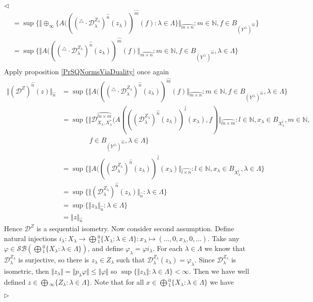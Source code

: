 \documentclass[12pt]{article}
\newenvironment{proof}{\par $\triangleleft$}{$\triangleright$}
\begin{document}
\begin{proof}
$$\begin{aligned}
&=\sup\{\Vert \oplus_\infty\{A((({}^\triangle\cdot\mathcal{D}_\lambda^{Z_\lambda})^{\wideparen{n}}(z_\lambda))^{\wideparen{m}}(f):\lambda\in\Lambda\}\Vert_{\wideparen{m\times n}}: m\in\mathbb{N},f\in B_{(Y^\triangle)^{\wideparen{m}}}\}\\
&=\sup\{\Vert A((({}^\triangle\cdot\mathcal{D}_\lambda^{Z_\lambda})^{\wideparen{n}}(z_\lambda))^{\wideparen{m}}(f)\Vert_{\wideparen{m\times n}}: m\in\mathbb{N},f\in B_{(Y^\triangle)^{\wideparen{m}}},\lambda\in\Lambda\}\\
\end{aligned}
$$
Apply proposition \ref{PrSQNormsViaDuality} once again
$$
\begin{aligned}
\Vert(\mathcal{D}^Z)^{\wideparen{n}}(z)\Vert_{\wideparen{n}}
&=\sup\{\Vert A((({}^\triangle\cdot\mathcal{D}_\lambda^{Z_\lambda})^{\wideparen{n}}(z_\lambda))^{\wideparen{m}}(f)\Vert_{\wideparen{m\times n}}: m\in\mathbb{N},f\in B_{(Y^\triangle)^{\wideparen{m}}},\lambda\in\Lambda\}\\
&=\sup\{\Vert\mathcal{D}_{X_\lambda,X_\lambda^*}^{\wideparen{ln\times m}}(A(((\mathcal{D}_\lambda^{Z_\lambda})^{\wideparen{n}}(z_\lambda))^{\wideparen{l}}(x_\lambda),f)\Vert_{\wideparen{ln\times m}}: l\in\mathbb{N},x_\lambda\in B_{X_\lambda^{\wideparen{l}}},m\in\mathbb{N},\\
&\qquad\qquad f\in B_{(Y^\triangle)^{\wideparen{m}}},\lambda\in\Lambda\}\\
&=\sup\{\Vert A(((\mathcal{D}_\lambda^{Z_\lambda})^{\wideparen{n}}(z_\lambda))^{\wideparen{l}}(x_\lambda)\Vert_{\wideparen{l\times n}}: l\in\mathbb{N},x_\lambda\in B_{X_\lambda^{\wideparen{l}}},\lambda\in\Lambda\}\\
&=\sup\{\Vert (\mathcal{D}_\lambda^{Z_\lambda})^{\wideparen{n}}(z_\lambda)\Vert_{\wideparen{n}}: \lambda\in\Lambda\}\\
&=\sup\{\Vert z_\lambda \Vert_{\wideparen{n}}: \lambda\in\Lambda\}\\
&=\Vert z \Vert_{\wideparen{n}}
\end{aligned}
$$
Hence $\mathcal{D}^Z$ is a sequential isometry. Now consider second assumption. Define natural injections $i_\lambda:X_\lambda\to\bigoplus{}_1^0\{X_\lambda:\lambda\in\Lambda\}:x_\lambda\mapsto (\ldots,0,x_\lambda,0,\ldots)$. Take any $\varphi\in\mathcal{SB}(\bigoplus{}_1^0\{X_\lambda:\lambda\in\Lambda\})$, and define $\varphi_\lambda=\varphi i_\lambda$. For each $\lambda\in\Lambda$ we know that $\mathcal{D}_\lambda^{Z_\lambda}$ is surjective, so there is $z_\lambda\in Z_\lambda$ such that $\mathcal{D}_\lambda^{Z_\lambda}(z_\lambda)=\varphi_\lambda$. Since $\mathcal{D}_\lambda^{Z_\lambda}$ is isometric, then $\Vert z_\lambda\Vert=\Vert p_\lambda\varphi\Vert\leq\Vert \varphi\Vert$ so $\sup\{\Vert z_\lambda\Vert:\lambda\in\Lambda\}<\infty$. Then we have well defined $z\in\bigoplus{}_\infty\{Z_\lambda:\lambda\in\Lambda\}$. Note that for all $x\in \bigoplus{}_1^0\{X_\lambda:\lambda\in\Lambda\}$ we have

\end{proof}
\end{document}
